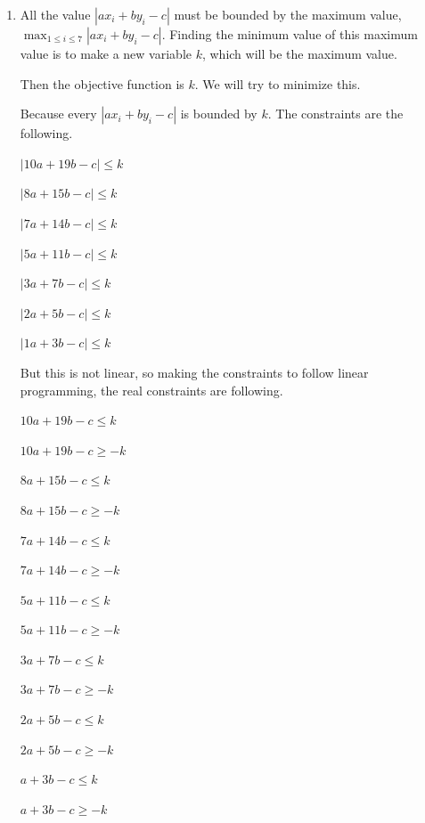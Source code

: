 \documentclass[a4paper,11pt]{article}
\begin{document}
\begin{enumerate}
\item 
All the value $|ax_i + by_i - c|$ must be bounded by the maximum value,$\max_{1\leq i\leq 7} |ax_i + by_i - c|$. Finding the minimum value of this maximum value is to make a new variable $k$, which will be the maximum value.

Then the objective function is $k$. We will try to minimize this.

Because every $|ax_i +by_i - c|$ is bounded by $k$. The constraints are the following.

$|10a +19b-c|\leq k$

$|8a +15b-c|\leq k$

$|7a +14b-c|\leq k$

$|5a +11b-c|\leq k$

$|3a +7b-c|\leq k$

$|2a +5b-c|\leq k$

$|1a +3b-c|\leq k$

But this is not linear, so making the constraints to follow linear programming, the real constraints are following.

$10a +19b-c\leq k$

$10a +19b-c\geq -k$

$8a +15b-c\leq k$

$8a +15b-c\geq -k$

$7a +14b-c\leq k$

$7a +14b-c\geq -k$

$5a +11b-c\leq k$

$5a +11b-c\geq -k$

$3a +7b-c\leq k$

$3a +7b-c\geq -k$

$2a +5b-c\leq k$

$2a +5b-c\geq -k$

$a +3b-c\leq k$

$a +3b-c\geq -k$

\end{enumerate}
\end{document}

